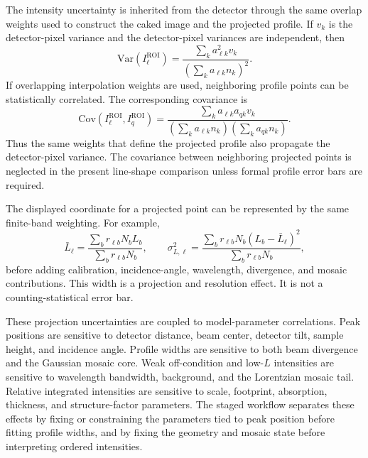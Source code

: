 The intensity uncertainty is inherited from the detector through the same overlap weights used to construct the caked image and the projected profile. If $v_k$ is the detector-pixel variance and the detector-pixel variances are independent, then
\begin{equation}
\mathrm{Var}\!\left(I_{\ell}^{\mathrm{ROI}}\right)=
\frac{\sum_k a_{\ell k}^{2}v_k}
     {\left(\sum_k a_{\ell k}n_k\right)^2}.
\end{equation}
If overlapping interpolation weights are used, neighboring profile points can be statistically correlated. The corresponding covariance is
\begin{equation}
\mathrm{Cov}\!\left(I_{\ell}^{\mathrm{ROI}},I_{q}^{\mathrm{ROI}}\right)=
\frac{\sum_k a_{\ell k}a_{qk}v_k}
     {\left(\sum_k a_{\ell k}n_k\right)
      \left(\sum_k a_{qk}n_k\right)}.
\end{equation}
Thus the same weights that define the projected profile also propagate the detector-pixel variance. The covariance between neighboring projected points is neglected in the present line-shape comparison unless formal profile error bars are required.

The displayed coordinate for a projected point can be represented by the same finite-band weighting. For example,
\begin{equation}
\bar L_{\ell}=\frac{\sum_b r_{\ell b}N_bL_b}{\sum_b r_{\ell b}N_b},
\qquad
\sigma^2_{L,\ell}=\frac{\sum_b r_{\ell b}N_b(L_b-\bar L_{\ell})^2}{\sum_b r_{\ell b}N_b},
\end{equation}
before adding calibration, incidence-angle, wavelength, divergence, and mosaic contributions. This width is a projection and resolution effect. It is not a counting-statistical error bar.

These projection uncertainties are coupled to model-parameter correlations. Peak positions are sensitive to detector distance, beam center, detector tilt, sample height, and incidence angle. Profile widths are sensitive to both beam divergence and the Gaussian mosaic core. Weak off-condition and low-$L$ intensities are sensitive to wavelength bandwidth, background, and the Lorentzian mosaic tail. Relative integrated intensities are sensitive to scale, footprint, absorption, thickness, and structure-factor parameters. The staged workflow separates these effects by fixing or constraining the parameters tied to peak position before fitting profile widths, and by fixing the geometry and mosaic state before interpreting ordered intensities.

